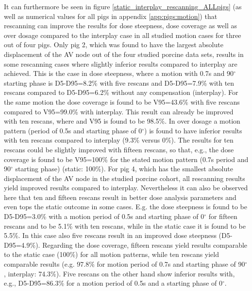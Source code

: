 \documentclass[type=dr, dr=rernat, accentcolor=tud7b,colorbacktitle, bigchapter, openright, twoside, 12pt ]{tudthesis}
\begin{document}
It can furthermore be seen in figure \ref{static_interplay_rescanning_ALLpigs} (as well as numerical values for all pigs in appendix \ref{app:pigs:motion}) 
that rescanning can improve the results for dose steepness, dose coverage as well as over dosage compared to the interplay case in all studied 
motion cases for three out of four pigs. Only pig 2, which was found to have the largest absolute displacement of the AV node out of the four 
studied porcine data sets, results in some rescanning cases where slightly inferior results compared to interplay are achieved. This is the 
case in dose steepness, where a motion with 0.7s and 90$^{\circ}$ starting phase is D5-D95=8.2\% with five rescans and D5-D95=7.9\% 
with ten rescans compared to D5-D95=6.2\% without any compensation (interplay). For the same motion the dose coverage is found to be V95=43.6\% 
with five rescans compared to V95=99.0\% with interplay. This result can already be improved with ten rescans, where and V95 is found to be 98.5\%.  
In over dosage a motion pattern (period of 0.5s and starting phase of 0$^{\circ}$) is found to have inferior results with ten rescans compared 
to interplay (9.3\% versus 0\%). The results for ten rescans could be slightly improved with fifteen rescans, so that, e.g., 
the dose coverage is found to be V95=100\% for the stated motion pattern (0.7s period and 90$^{\circ}$ starting phase) (static: 100\%). 
For pig 4, which has the smallest absolute displacement of the AV node in the studied porcine cohort, all rescanning results yield 
improved results compared to interplay. Nevertheless it can also be observed here that ten and fifteen rescans result in better dose analysis 
parameters and even tops the static outcome in some cases. E.g. the dose steepness is found to be D5-D95=3.0\% with a motion period of 0.5s 
and starting phase of 0$^{\circ}$ for fifteen rescans and to be 5.1\% with ten rescans, while in the static case it is found to be 5.5\%. 
In this case also five rescans result in an improved dose steepness (D5-D95=4.9\%). 
Regarding the dose coverage, fifteen rescans yield results comparable to the static case (100\%) for all motion patterns, while ten rescans 
yield comparable results (e.g. 97.8\% for motion period of 0.7s and starting phase of 90$^{\circ}$, interplay: 74.3\%). Five rescans 
on the other hand show inferior results with, e.g., D5-D95=86.3\% for a motion period of 0.5s and a starting phase of 0$^{\circ}$.\newline  

\newpage
\end{document}
